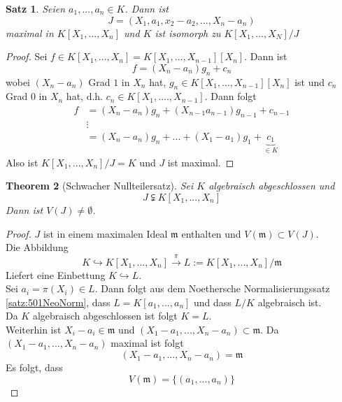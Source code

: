\documentclass[10pt,a4paper]{article}
\theoremstyle{plain}
\newtheorem{theorem}{Theorem}[section]
\newtheorem{satz}[theorem]{Satz}
\theoremstyle{definition}
\theoremstyle{remark}
\begin{document}
	\begin{satz}
		Seien $a_1,...,a_n\in K$. Dann ist
		\[J=(X_1,a_1,x_2-a_2,...,X_n-a_n)\]
		maximal in $K[X_1,...,X_n]$ und $K$ ist isomorph zu $K[X_1,...,X_N]/J$
	\end{satz}
	\begin{proof}
		Sei $f\in  K[X_1,...,X_n]=K[X_1,...,X_{n-1}][X_n]$. Dann ist
		\[f=(X_n-a_n)g_n+c_n\]
		wobei $(X_n-a_n)$ Grad $1$ in $X_n$ hat, $g_n\in K[X_1,...,X_{n-1}][X_n]$ ist und $c_n$ Grad $0$ in $X_n$ hat, d.h. $c_n\in K[X_1,....,X_{n-1}]$. Dann folgt
		\begin{align*}
		f&=(X_n-a_n)g_n+(X_{n-1}a_{n-1})g_{n-1}+c_{n-1}\\
		&\vdots\\
		&=(X_n-a_n)g_n+...+(X_1-a_1)g_1+\underbrace{c_1}_{\in K}
		\end{align*}
		Also ist $K[X_1,...,X_n]/J=K$ und $J$ ist maximal.
	\end{proof}

	\begin{theorem}[Schwacher Nullteilersatz]
		Sei $K$ algebraisch abgeschlossen und
		\[J\subsetneqq K[X_1,...,X_n]\]
		Dann ist $V(J)\neq\emptyset$.
	\end{theorem}
	\begin{proof}
		$J$ ist in einem maximalen Ideal $\mathfrak m$ enthalten und $V(\mathfrak m)\subset V(J)$.\\
		Die Abbildung
		\[K\hookrightarrow K[X_1,...,X_n]\xrightarrow{\pi}L:=K[X_1,...,X_n]/\mathfrak m\]
		Liefert eine Einbettung $K\hookrightarrow L$.\\
		Sei $a_i=\pi(X_i)\in L$. Dann folgt aus dem Noethersche Normalisierungssatz \ref{satz:501NeoNorm}, dass $L=K[a_1,...,a_n]$ und dass $L/K$ algebraisch ist.\\
		Da $K$ algebraisch abgeschlossen ist folgt $K=L$.\\
		Weiterhin ist $X_i-a_i\in\mathfrak m$ und $(X_1-a_1,...,X_n-a_n)\subset \mathfrak m$. Da $(X_1-a_1,...,X_n-a_n)$ maximal ist folgt
		\[(X_1-a_1,...,X_n-a_n)=\mathfrak m\]
		Es folgt, dass
		\[V(\mathfrak m)=\{(a_1,...,a_n)\}\]
	\end{proof}
\end{document}
